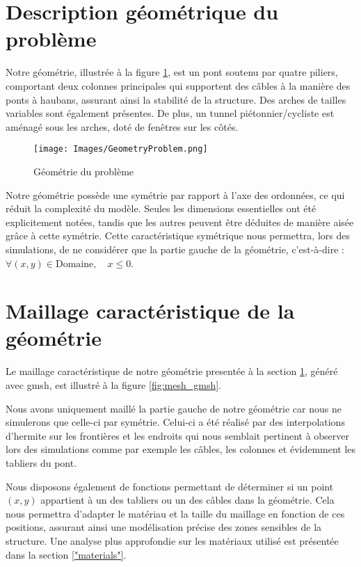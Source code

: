 \documentclass{article}
\begin{document}
\section{Description géométrique du problème}
\label{geometry}

Notre géométrie, illustrée à la figure \ref{fig:geometry}, est un pont soutenu par quatre piliers, comportant deux colonnes principales qui supportent des câbles à la manière des ponts à haubans, assurant ainsi la stabilité de la structure. Des arches de tailles variables sont également présentes. De plus, un tunnel piétonnier/cycliste est aménagé sous les arches, doté de fenêtres sur les côtés.

\begin{figure}[H]
    \centering
    \texttt{[image: Images/GeometryProblem.png]}
    \caption{Géométrie du problème}
    \label{fig:geometry}
\end{figure}

Notre géométrie possède une symétrie par rapport à l'axe des ordonnées, ce qui réduit la complexité du modèle. Seules les dimensions essentielles ont été explicitement notées, tandis que les autres peuvent être déduites de manière aisée grâce à cette symétrie. Cette caractéristique symétrique nous permettra, lors des simulations, de ne considérer que la partie gauche de la géométrie, c'est-à-dire : $\forall (x,y) \in \text{Domaine}, \quad x \leq 0$.


\section{Maillage caractéristique de la géométrie}
\label{"mesh"}

Le maillage caractéristique de notre géométrie presentée à la section \ref{geometry}, généré avec gmsh, est illustré à la figure \ref{fig:mesh_gmsh}.

Nous avons uniquement maillé la partie gauche de notre géométrie car nous ne simulerons que celle-ci par symétrie. Celui-ci a été réalisé par des interpolations d'hermite sur les frontières et les endroits qui nous semblait pertinent à observer lors des simulations comme par exemple les câbles, les colonnes et évidemment les tabliers du pont.

Nous disposons également de fonctions permettant de déterminer si un point $(x, y)$ appartient à un des tabliers ou un des câbles dans la géométrie. Cela nous permettra d'adapter le matériau et la taille du maillage en fonction de ces positions, assurant ainsi une modélisation précise des zones sensibles de la structure. Une analyse plus approfondie sur les matériaux utilisé est présentée dans la section \ref{"materials"}.
\end{document}
